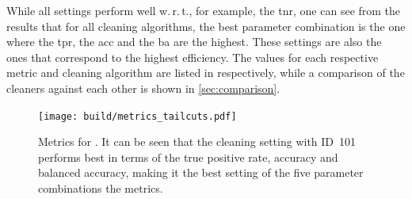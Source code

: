 While all settings perform well w.\,r.\,t., for example, the \gls{tnr}, one can see from the results that for all cleaning
algorithms, the best parameter combination is the one where the \gls{tpr}, the \gls{acc} and the \gls{ba}
are the highest. These settings are also the ones that correspond to the highest efficiency.
The values for each respective metric and cleaning algorithm are listed in
 respectively, while
a comparison of the cleaners against each other is shown in \autoref{sec:comparison}.
\begin{table}
    \centering
    \caption{Results for the metrics of \tailcuts{}. One can see that the best results are obtained
    for the setting with ID~101.}%
    \label{tab:metrics_tail}
\end{table}

\begin{figure}
    \centering
    \texttt{[image: build/metrics\_tailcuts.pdf]}
    \caption{Metrics for \tailcuts{}. It can be seen that the cleaning setting with ID~101 performs
    best in terms of the true positive rate, accuracy and balanced accuracy, making it the best
    setting of the five parameter combinations \wrt the metrics.}%
    \label{fig:metrics_tail}
\end{figure}

